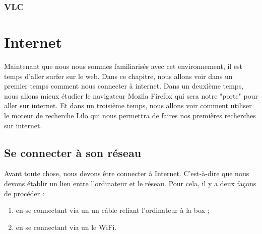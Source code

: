 \documentclass[12pt]{book}
\begin{document}
	\subsection{VLC}

\chapter{Internet}
Maintenant que nous nous sommes familiarisés avec cet environnement, il est temps d'aller surfer sur le web.\newline
Dans ce chapitre, nous allons voir dans un premier temps comment nous connecter à internet.
Dans un deuxième temps, nous allons mieux étudier le navigateur Mozila Firefox qui sera notre "porte" pour aller sur internet.
Et dans un troisième temps, nous allons voir comment utiliser le moteur de recherche Lilo qui nous permettra de faires nos premières recherches sur internet.
\section{Se connecter à son réseau}
	Avant toute chose, nous devons être connecter à Internet. C'est-à-dire que nous devons établir un lien entre l'ordinateur et le réseau.
	Pour cela, il y a deux façons de procéder :
	\begin{enumerate}
		\item en se connectant via un un câble reliant l'ordinateur à la box ;
		\item en se connectant via un le WiFi.
	\end{enumerate}
\end{document}
